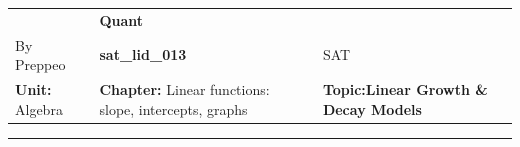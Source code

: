 \documentclass[11pt,paper=a4,answers]{exam}
\begin{document}
\begin{center}
    \centering
    \renewcommand{\arraystretch}{1.5}
    \begin{tabularx}{\textwidth}{YYY}
    & \normalsize\bf{{\Large{{Quant}}}} & \\
    By Preppeo & \normalsize\bf{{sat\_lid\_013}} & SAT\\
    \normalsize{{\textbf{{Unit:}} Algebra}} & \normalsize{{\textbf{{Chapter:}} Linear functions: slope, intercepts, graphs}} & \normalsize{{\textbf{{Topic:Linear Growth \& Decay Models}} }} \\
    \end{tabularx}
\end{center}
\par\noindent\rule{\textwidth}{1pt}
\end{document}
